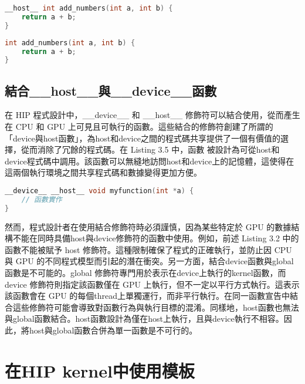 \begin{lstlisting}[language=C, caption={在HIP kernel中使用\_\_host\_\_函數}, label={3rd:example}]
__host__ int add_numbers(int a, int b) {
    return a + b;
}
\end{lstlisting}

\begin{lstlisting}[language=C, caption={在HIP kernel中使用預設函數}, label={4th:example}]
int add_numbers(int a, int b) {
    return a + b;
}
\end{lstlisting}

\subsection{結合\_\_host\_\_與\_\_device\_\_函數}

在 HIP 程式設計中，\_\_device\_\_ 和 \_\_host\_\_ 修飾符可以結合使用，從而產生在 CPU 和 GPU 上可見且可執行的函數。這些結合的修飾符創建了所謂的「device與host函數」，為host和device之間的程式碼共享提供了一個有價值的選擇，從而消除了冗餘的程式碼。在 Listing 3.5 中，函數  被設計為可從host和device程式碼中調用。該函數可以無縫地訪問host和device上的記憶體，這使得在這兩個執行環境之間共享程式碼和數據變得更加方便。

\begin{lstlisting}[language=C, caption={在HIP kernel中結合\code{\_\_host\_\_}與\code{\_\_device\_\_}函數}, label={5th:example}]
__device__ __host__ void myfunction(int *a) {
    // 函數實作
}
\end{lstlisting}

然而，程式設計者在使用結合修飾符時必須謹慎，因為某些特定於 GPU 的數據結構不能在同時具備host與device修飾符的函數中使用。例如，前述 Listing 3.2 中的  函數不能被賦予 host 修飾符。這種限制確保了程式的正確執行，並防止因 CPU 與 GPU 的不同程式模型而引起的潛在衝突。另一方面，結合device函數與global函數是不可能的。global 修飾符專門用於表示在device上執行的kernel函數，而 device 修飾符則指定該函數僅在 GPU 上執行，但不一定以平行方式執行。這表示該函數會在 GPU 的每個thread上單獨運行，而非平行執行。在同一函數宣告中結合這些修飾符可能會導致對函數行為與執行目標的混淆。同樣地，host函數也無法與global函數結合。host函數設計為僅在host上執行，且與device執行不相容。因此，將host與global函數合併為單一函數是不可行的。

\section{在HIP kernel中使用模板}

